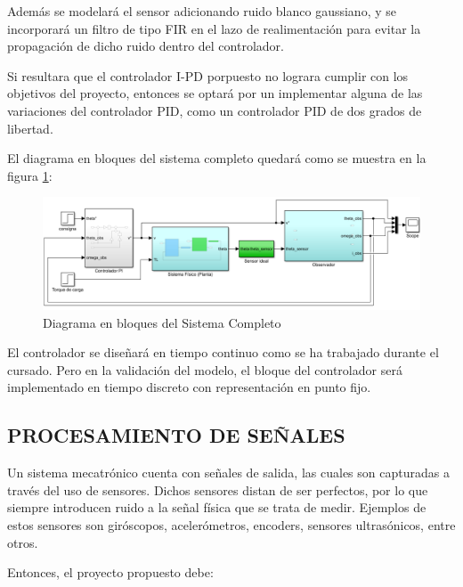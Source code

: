 \documentclass{article}
\begin{document}
Además se modelará el sensor adicionando ruido blanco gaussiano, y se incorporará un filtro de tipo FIR en el lazo de realimentación para evitar la propagación de dicho ruido dentro del controlador.

Si resultara que el controlador I-PD porpuesto no lograra cumplir con los objetivos del proyecto, entonces se optará por un implementar alguna de las variaciones del controlador PID, como un controlador PID de dos grados de libertad.

El diagrama en bloques del sistema completo quedará como se muestra en la figura \ref{fig:Diagrama en bloques del Sistema Completo}:

\begin{figure}[H]
    \centering
    \includegraphics[width=1.1\textwidth]{Diagrama en bloques del Sistema Completo}
    \caption{Diagrama en bloques del Sistema Completo}
    \label{fig:Diagrama en bloques del Sistema Completo}
\end{figure}

El controlador se diseñará en tiempo continuo como se ha trabajado durante el cursado. Pero en la validación del modelo, el bloque del controlador será implementado en tiempo discreto con representación en punto fijo.




\subsection{PROCESAMIENTO DE SEÑALES}
\label{sec:PROCESAMIENTO DE SEÑALES}

Un sistema mecatrónico cuenta con señales de salida, las cuales son capturadas a través del uso de sensores. Dichos sensores distan de ser perfectos, por lo que siempre introducen ruido a la señal física que se trata de medir. Ejemplos de estos sensores son giróscopos, acelerómetros, encoders, sensores ultrasónicos, entre otros.

Entonces, el proyecto propuesto debe:
\end{document}

